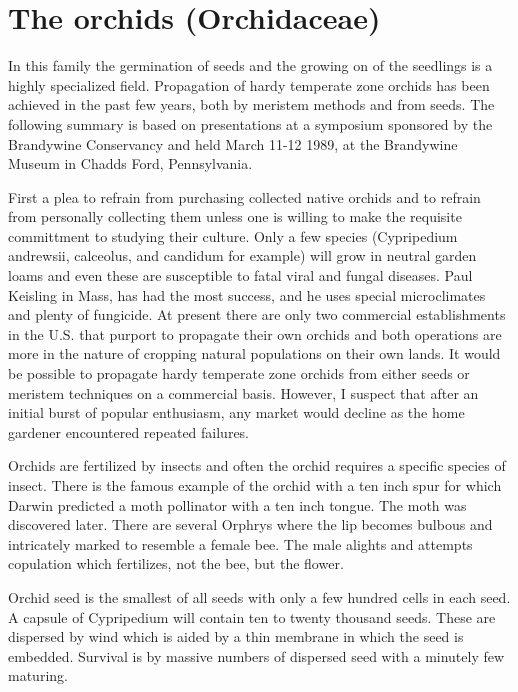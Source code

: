 \chapter{The orchids (Orchidaceae)}

In this family the germination of seeds and the growing on of the seedlings is a
highly specialized field. Propagation of hardy temperate zone orchids has been
achieved in the past few years, both by meristem methods and from seeds. The
following summary is based on presentations at a symposium sponsored by the
Brandywine Conservancy and held March 11-12 1989, at the Brandywine Museum in
Chadds Ford, Pennsylvania.

First a plea to refrain from purchasing collected native orchids and to refrain
from personally collecting them unless one is willing to make the requisite
committment to studying their culture. Only a few species (Cypripedium andrewsii,
calceolus, and candidum for example) will grow in neutral garden loams and even
these are susceptible to fatal viral and fungal diseases. Paul Keisling in Mass, has
had the most success, and he uses special microclimates and plenty of fungicide. At
present there are only two commercial establishments in the U.S. that purport to
propagate their own orchids and both operations are more in the nature of cropping
natural populations on their own lands. It would be possible to propagate hardy
temperate zone orchids from either seeds or meristem techniques on a commercial
basis. However, I suspect that after an initial burst of popular enthusiasm, any market
would decline as the home gardener encountered repeated failures.

Orchids are fertilized by insects and often the orchid requires a specific species
of insect. There is the famous example of the orchid with a ten inch spur for which
Darwin predicted a moth pollinator with a ten inch tongue. The moth was discovered
later. There are several Orphrys where the lip becomes bulbous and intricately
marked to resemble a female bee. The male alights and attempts copulation which
fertilizes, not the bee, but the flower.

Orchid seed is the smallest of all seeds with only a few hundred cells in each
seed. A capsule of Cypripedium will contain ten to twenty thousand seeds. These are
dispersed by wind which is aided by a thin membrane in which the seed is embedded.
Survival is by massive numbers of dispersed seed with a minutely few maturing.

